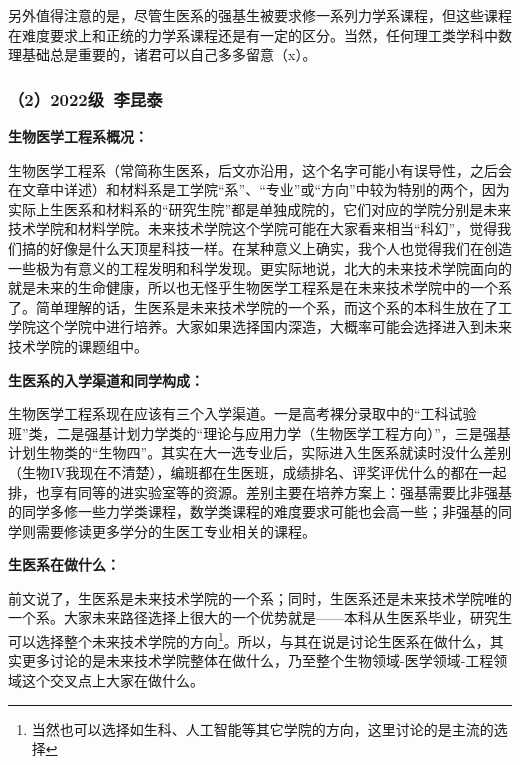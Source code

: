 \vspace{10pt}

另外值得注意的是，尽管生医系的强基生被要求修一系列力学系课程，但这些课程在难度要求上和正统的力学系课程还是有一定的区分。当然，任何理工类学科中数理基础总是重要的，诸君可以自己多多留意（x）。

\subsubsection{（2）2022级\ 李昆泰}
\textbf{生物医学工程系概况：}

生物医学工程系（常简称生医系，后文亦沿用，这个名字可能小有误导性，之后会在文章中详述）和材料系是工学院“系”、“专业”或“方向”中较为特别的两个，因为实际上生医系和材料系的“研究生院”都是单独成院的，它们对应的学院分别是未来技术学院和材料学院。未来技术学院这个学院可能在大家看来相当“科幻”，觉得我们搞的好像是什么天顶星科技一样。在某种意义上确实，我个人也觉得我们在创造一些极为有意义的工程发明和科学发现。更实际地说，北大的未来技术学院面向的就是未来的生命健康，所以也无怪乎生物医学工程系是在未来技术学院中的一个系了。简单理解的话，生医系是未来技术学院的一个系，而这个系的本科生放在了工学院这个学院中进行培养。大家如果选择国内深造，大概率可能会选择进入到未来技术学院的课题组中。

\vspace{10pt}

\textbf{生医系的入学渠道和同学构成：}

生物医学工程系现在应该有三个入学渠道。一是高考裸分录取中的“工科试验班”类，二是强基计划力学类的“理论与应用力学（生物医学工程方向）”，三是强基计划生物类的“生物四”。其实在大一选专业后，实际进入生医系就读时没什么差别（生物IV我现在不清楚），编班都在生医班，成绩排名、评奖评优什么的都在一起排，也享有同等的进实验室等的资源。差别主要在培养方案上：强基需要比非强基的同学多修一些力学类课程，数学类课程的难度要求可能也会高一些；非强基的同学则需要修读更多学分的生医工专业相关的课程。

\vspace{10pt}

\textbf{生医系在做什么：}

前文说了，生医系是未来技术学院的一个系；同时，生医系还是未来技术学院唯的一个系。大家未来路径选择上很大的一个优势就是——本科从生医系毕业，研究生可以选择整个未来技术学院的方向\footnote{当然也可以选择如生科、人工智能等其它学院的方向，这里讨论的是主流的选择}。所以，与其在说是讨论生医系在做什么，其实更多讨论的是未来技术学院整体在做什么，乃至整个生物领域-医学领域-工程领域这个交叉点上大家在做什么。

\vspace{10pt}

